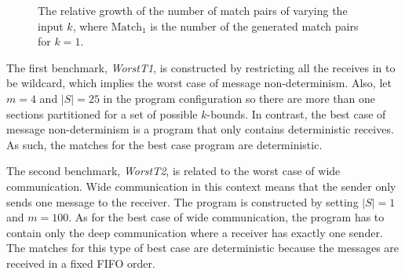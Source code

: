 \begin{figure}[!h]

\caption{The relative growth of the number of match pairs of varying the input $k$, where $\mathrm{Match}_1$ is the number of the generated match pairs for $k=1$.}
\label{fig:relation:match}
\end{figure}

The first benchmark, \textit{WorstT1}, is constructed by restricting all the receives in  to be wildcard, which implies the worst case of message non-determinism. Also, let $m=4$ and $|S| = 25$ in the program configuration so there are more than one sections partitioned for a set of possible $k$-bounds. In contrast, the best case of message non-determinism is a program that only contains deterministic receives. As such, the matches for the best case program are deterministic.

The second benchmark, \textit{WorstT2}, is related to the worst case of wide communication. Wide communication in this context means that the sender only sends one message to the receiver. The program is constructed by setting $|S|=1$ and $m=100$. As for the best case of wide communication, the program has to contain only the deep communication where a receiver has exactly one sender. The matches for this type of best case are deterministic because the messages are received in a fixed FIFO order. 

